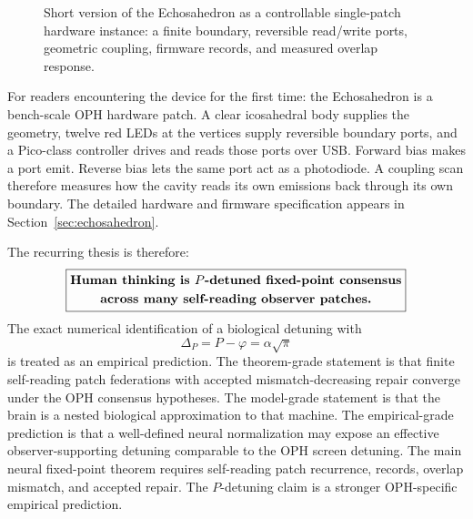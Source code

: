 \documentclass[11pt]{article}
\theoremstyle{remark}
\theoremstyle{plain}
\begin{document}
\begin{figure}[ht]
\centering
{}
\caption{Short version of the Echosahedron as a controllable single-patch hardware instance: a finite boundary, reversible read/write ports, geometric coupling, firmware records, and measured overlap response.}
\label{fig:echosahedron-short}
\end{figure}

For readers encountering the device for the first time: the Echosahedron is a bench-scale OPH hardware patch. A clear icosahedral body supplies the geometry, twelve red LEDs at the vertices supply reversible boundary ports, and a Pico-class controller drives and reads those ports over USB. Forward bias makes a port emit. Reverse bias lets the same port act as a photodiode. A coupling scan therefore measures how the cavity reads its own emissions back through its own boundary. The detailed hardware and firmware specification appears in Section~\ref{sec:echosahedron}.

The recurring thesis is therefore:
\[
\boxed{
\begin{gathered}
\text{\bfseries Human thinking is }P\text{\bfseries -detuned fixed-point consensus}\\
\text{\bfseries across many self-reading observer patches.}
\end{gathered}
}
\]
The exact numerical identification of a biological detuning with
\[
\Delta_P=P-\varphi=\alpha\sqrt{\pi}
\]
is treated as an empirical prediction. The theorem-grade statement is that finite self-reading patch federations with accepted mismatch-decreasing repair converge under the OPH consensus hypotheses. The model-grade statement is that the brain is a nested biological approximation to that machine. The empirical-grade prediction is that a well-defined neural normalization may expose an effective observer-supporting detuning comparable to the OPH screen detuning.
The main neural fixed-point theorem requires self-reading patch recurrence, records, overlap mismatch, and accepted repair. The \(P\)-detuning claim is a stronger OPH-specific empirical prediction.
\end{document}
